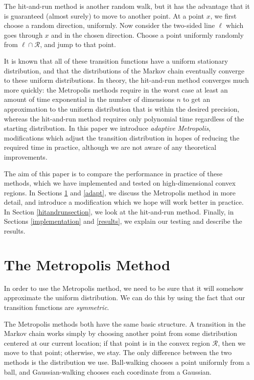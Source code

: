 \documentclass[11pt]{article}
\begin{document}
The hit-and-run method is another random walk, but it has the advantage that it is guaranteed (almost surely) to move to another point. At a point $x$, we first choose a random direction, uniformly. Now consider the two-sided line $\ell$ which goes through $x$ and in the chosen direction. Choose a point uniformly randomly from $\ell\cap\mathcal{R}$, and jump to that point.

It is known that all of these transition functions have a uniform stationary distribution, and that the distributions of the Markov chain eventually converge to these uniform distributions. In theory, the hit-and-run method converges much more quickly: the Metropolis methods require in the worst case at least an amount of time exponential in the number of dimensions $n$ to get an approximation to the uniform distribution that is within the desired precision, whereas the hit-and-run method requires only polynomial time regardless of the starting distribution. In this paper we introduce \emph{adaptive Metropolis}, modifications which adjust the transition distribution in hopes of reducing the required time in practice, although we are not aware of any theoretical improvements.

The aim of this paper is to compare the performance in practice of these methods, which we have implemented and tested on high-dimensional convex regions. In Sections \ref{metro} and \ref{adapt}, we discuss the Metropolis method in more detail, and introduce a modification which we hope will work better in practice. In Section \ref{hitandrunsection}, we look at the hit-and-run method. Finally, in Sections \ref{implementation} and \ref{results}, we explain our testing and describe the results.

\section{The Metropolis Method}\label{metro}

In order to use the Metropolis method, we need to be sure that it will somehow approximate the uniform distribution. We can do this by using the fact that our transition functions are \emph{symmetric}.

The Metropolis methods both have the same basic structure. A transition in the Markov chain works simply by choosing another point from some distribution centered at our current location; if that point is in the convex region $\mathcal{R}$, then we move to that point; otherwise, we stay. The only difference between the two methods is the distribution we use. Ball-walking chooses a point uniformly from a ball, and Gaussian-walking chooses each coordinate from a Gaussian.
\end{document}
